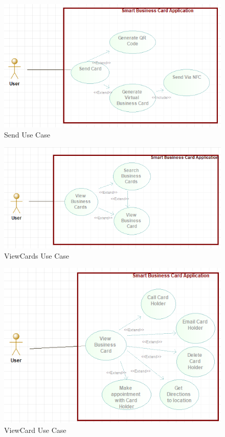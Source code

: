 \documentclass[english]{article}
\begin{document}
					\begin{figure}
						\includegraphics[width=\linewidth]{../UseCaseDiagrams/SendUseCase.png}
						\caption{Send Use Case}
						\label{fig:Send}
					\end{figure}
					\begin{figure}
						\includegraphics[width=\linewidth]{../UseCaseDiagrams/ViewCardsUseCase.png}
						\caption{ViewCards Use Case}
						\label{fig:ViewCards}
					\end{figure}
					\begin{figure}
						\includegraphics[width=\linewidth]{../UseCaseDiagrams/ViewCardUseCase.png}
						\caption{ViewCard Use Case}
						\label{fig:ViewCard}
					\end{figure}
					\newpage
					
\end{document}
